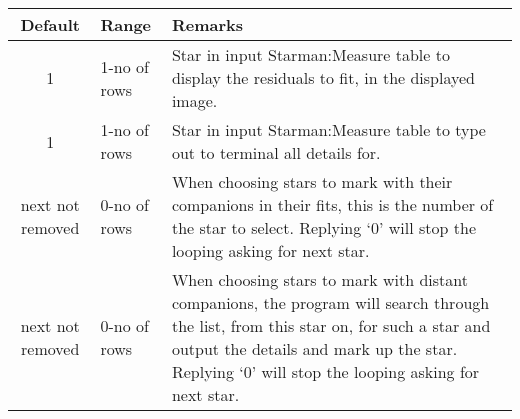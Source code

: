 \begin{small}
{{{\begin{tabular}{|c|l|p{3in}|}\hline
  Default    & Range         &  Remarks \\ \hline
  1   &       1-no of rows & Star in input Starman:Measure table to
                             display the residuals to fit, in the
                             displayed image. \\
  1    &      1-no of rows & Star in input Starman:Measure table to type
                             out to terminal all details for. \\
  next not removed &  0-no of rows &  When choosing stars to mark with their
                             companions in their fits, this is the
                             number of the star to select. Replying
                             `0' will stop the looping asking for next
                             star. \\
  next not removed &  0-no of rows & When choosing stars to mark with distant
                             companions, the program will search
                             through the list, from this star on, for
                             such a star and output the details and
                             mark up the star. Replying `0' will stop
                             the looping asking for next star. \\ \hline
\end{tabular}

}}}
\end{small}
